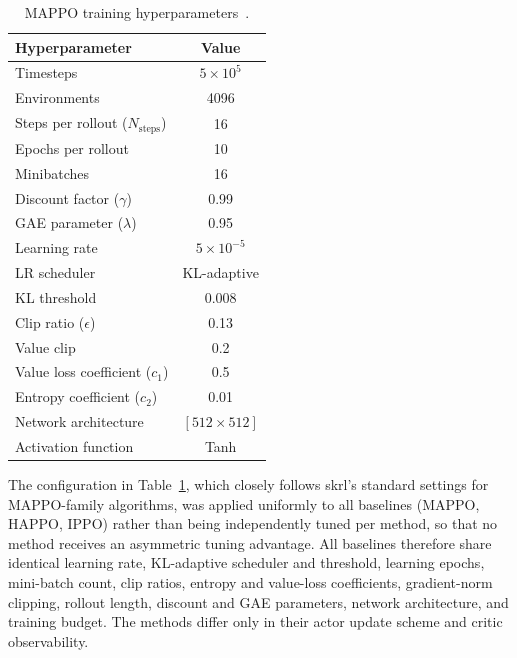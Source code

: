 \begin{table}[htbp]
\centering
\caption{MAPPO training hyperparameters~\citep{sk2026priorguided}.}
\label{tab:alpha_hyper}
\begin{tabular}{lc}
\toprule
\textbf{Hyperparameter} & \textbf{Value} \\
\midrule
Timesteps              & $5 \times 10^5$ \\
Environments             & 4096 \\
Steps per rollout ($N_{\text{steps}}$) & 16 \\
Epochs per rollout        & 10 \\
Minibatches                & 16 \\
Discount factor ($\gamma$)  & 0.99 \\
GAE parameter ($\lambda$)    & 0.95 \\
Learning rate                  & $5 \times 10^{-5}$ \\
LR scheduler                     & KL-adaptive \\
KL threshold                       & 0.008 \\
Clip ratio ($\epsilon$)              & 0.13 \\
Value clip                            & 0.2 \\
Value loss coefficient ($c_1$)          & 0.5 \\
Entropy coefficient ($c_2$)              & 0.01 \\
Network architecture                       & $[512 \times 512]$ \\
Activation function                          & Tanh \\
\bottomrule
\end{tabular}
\end{table}

The configuration in Table~\ref{tab:alpha_hyper}, which closely follows skrl's standard settings for
MAPPO-family algorithms, was applied uniformly to all baselines (MAPPO, HAPPO, IPPO) rather than being
independently tuned per method, so that no method receives an asymmetric tuning advantage. All
baselines therefore share identical learning rate, KL-adaptive scheduler and threshold, learning
epochs, mini-batch count, clip ratios, entropy and value-loss coefficients, gradient-norm clipping,
rollout length, discount and GAE parameters, network architecture, and training budget. The methods
differ only in their actor update scheme and critic observability.

